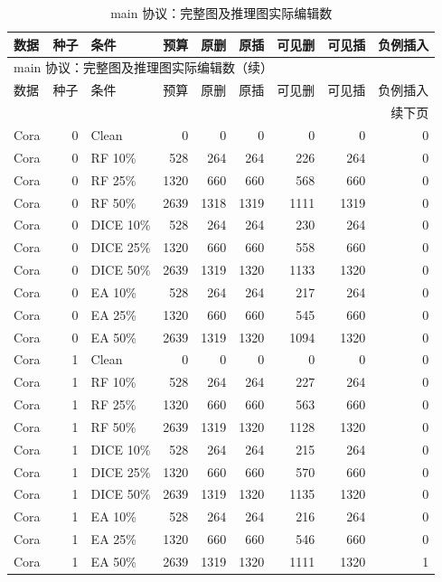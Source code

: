 {\footnotesize
\setlength{\tabcolsep}{3.2pt}
\renewcommand{\arraystretch}{1.10}
\begin{longtable}{lr l rrrrrr}
\caption{main 协议：完整图及推理图实际编辑数}\\
\toprule
数据 & 种子 & 条件 & 预算 & 原删 & 原插 & 可见删 & 可见插 & 负例插入 \\
\midrule
\endfirsthead
\multicolumn{9}{l}{main 协议：完整图及推理图实际编辑数（续）}\\
\toprule
数据 & 种子 & 条件 & 预算 & 原删 & 原插 & 可见删 & 可见插 & 负例插入 \\
\midrule
\endhead
\midrule\multicolumn{9}{r}{续下页}\\
\endfoot
\bottomrule
\endlastfoot
Cora & 0 & Clean & 0 & 0 & 0 & 0 & 0 & 0 \\
Cora & 0 & RF 10\% & 528 & 264 & 264 & 226 & 264 & 0 \\
Cora & 0 & RF 25\% & 1320 & 660 & 660 & 568 & 660 & 0 \\
Cora & 0 & RF 50\% & 2639 & 1318 & 1319 & 1111 & 1319 & 0 \\
Cora & 0 & DICE 10\% & 528 & 264 & 264 & 230 & 264 & 0 \\
Cora & 0 & DICE 25\% & 1320 & 660 & 660 & 558 & 660 & 0 \\
Cora & 0 & DICE 50\% & 2639 & 1319 & 1320 & 1133 & 1320 & 0 \\
Cora & 0 & EA 10\% & 528 & 264 & 264 & 217 & 264 & 0 \\
Cora & 0 & EA 25\% & 1320 & 660 & 660 & 545 & 660 & 0 \\
Cora & 0 & EA 50\% & 2639 & 1319 & 1320 & 1094 & 1320 & 0 \\
Cora & 1 & Clean & 0 & 0 & 0 & 0 & 0 & 0 \\
Cora & 1 & RF 10\% & 528 & 264 & 264 & 227 & 264 & 0 \\
Cora & 1 & RF 25\% & 1320 & 660 & 660 & 563 & 660 & 0 \\
Cora & 1 & RF 50\% & 2639 & 1319 & 1320 & 1128 & 1320 & 0 \\
Cora & 1 & DICE 10\% & 528 & 264 & 264 & 215 & 264 & 0 \\
Cora & 1 & DICE 25\% & 1320 & 660 & 660 & 570 & 660 & 0 \\
Cora & 1 & DICE 50\% & 2639 & 1319 & 1320 & 1135 & 1320 & 0 \\
Cora & 1 & EA 10\% & 528 & 264 & 264 & 216 & 264 & 0 \\
Cora & 1 & EA 25\% & 1320 & 660 & 660 & 546 & 660 & 0 \\
Cora & 1 & EA 50\% & 2639 & 1319 & 1320 & 1111 & 1320 & 1 \\

\end{longtable}}
